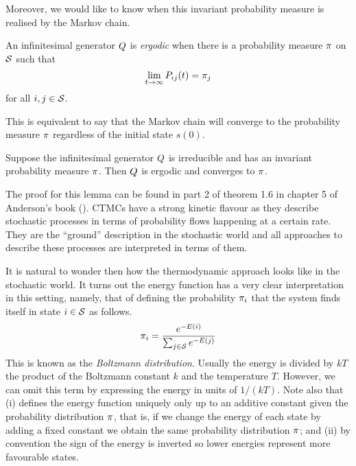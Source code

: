 Moreover, we would like to know when this invariant
probability measure is realised by the Markov chain.

\begin{definition}[ergodicity]
  An infinitesimal generator $Q$ is \emph{ergodic} when
  there is a probability measure $\pi$ on $\mathcal{S}$ such that
  \[ \lim_{t \to \infty} P_{ij}(t) = \pi_j \]
  for all $i,j \in \mathcal{S}$.
\end{definition}

This is equivalent to say that the Markov chain
will converge to the probability measure $\pi$
regardless of the initial state $s(0)$.

\begin{lemma}
  Suppose the infinitesimal generator $Q$ is irreducible
  and has an invariant probability measure $\pi$.
  Then $Q$ is ergodic and converges to $\pi$.
\end{lemma}

The proof for this lemma can be found in part 2 of theorem 1.6
in chapter 5 of Anderson's book (\cite*[][pages 160--161]{anderson}).
CTMCs have a strong kinetic flavour as they describe
stochastic processes in terms of probability flows
happening at a certain rate.
They are the ``ground'' description in the stochastic world
and all approaches to describe these processes
are interpreted in terms of them.

It is natural to wonder then how the thermodynamic approach
looks like in the stochastic world.
It turns out the energy function has a very clear interpretation
in this setting, namely, that of defining the probability $\pi_i$
that the system finds itself in state $i \in \mathcal{S}$ as follows.
\begin{equation}
  \label{eq:energy}
  \pi_i = \frac{e^{-E(i)}}{\sum_{j \in \mathcal{S}} e^{-E(j)}}
\end{equation}
This is known as the \emph{Boltzmann distribution}.
Usually the energy is divided by $kT$ the product of
the Boltzmann constant $k$ and the temperature $T$.
However, we can omit this term by expressing the energy
in units of $1/(kT)$.
Note also that (i)  defines the energy function
uniquely only up to an additive constant
given the probability distribution $\pi$,
that is, if we change the energy of each state by adding
a fixed constant we obtain the same probability distribution $\pi$;
and (ii) by convention the sign of the energy is inverted
so lower energies represent more favourable states.

